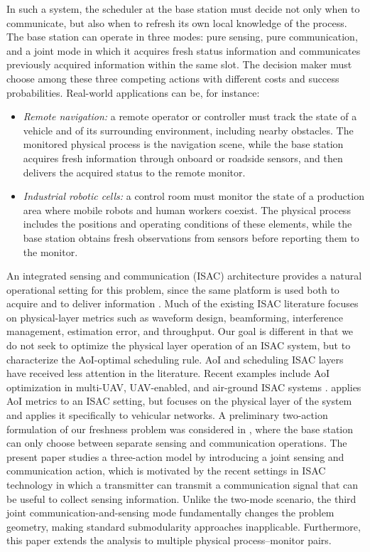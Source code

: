 \documentclass[letterpaper,journal]{IEEEtran}
\begin{document}
In such a system, the scheduler at the base station must decide not only when to communicate, but also when to refresh its own local knowledge of the process. The base station can operate in three modes: pure sensing, pure communication, and a joint mode in which it acquires fresh status information and communicates previously acquired information within the same slot. The decision maker must choose among these three competing actions with different costs and success probabilities.  Real-world applications can be, for instance:
\begin{itemize}
    \item \textit{Remote navigation:} a remote operator or controller must track the state of a vehicle and of its surrounding environment, including nearby obstacles. The monitored physical process is the navigation scene, while the base station acquires fresh information through onboard or roadside sensors, and then delivers the acquired status to the remote monitor.

    \item \textit{Industrial robotic cells:} a control room must monitor the state of a production area where mobile robots and human workers coexist. The physical process includes the positions and operating conditions of these elements, while the base station obtains fresh observations from sensors before reporting them to the monitor.
\end{itemize}

An integrated sensing and communication (ISAC) architecture provides a natural operational setting for this problem, since the same platform is used both to acquire and to deliver information \cite{liu2020joint,luong2021rrm_jrc,zhang2025intelligent_isac,wen2025iscc_survey}. Much of the existing ISAC literature focuses on physical-layer metrics such as waveform design, beamforming, interference management, estimation error, and throughput. Our goal is different in that we do not seek to optimize the physical layer operation of an ISAC system, but to characterize the AoI-optimal scheduling rule. AoI and scheduling ISAC layers have received less attention in the literature. Recent examples include AoI optimization in multi-UAV, UAV-enabled, and air-ground ISAC systems \cite{zhou2024multiuav_aoi,bai2025uav_isac_aoi,liu2025joint_aoi_iscc,mei2025aoi_jamming}. \cite{fan2026multimodal} applies AoI metrics to an ISAC setting, but focuses on the physical layer of the system and applies it specifically to vehicular networks. A preliminary two-action formulation of our freshness problem was considered in \cite{soleymani2026freshness_isac}, where the base station can only choose between separate sensing and communication operations. The present paper studies a three-action model by introducing a joint sensing and communication action, which is motivated by the recent settings in ISAC technology in which  a transmitter can transmit a communication signal that can be useful to collect sensing information. 
Unlike the two-mode scenario, the third joint communication-and-sensing mode fundamentally changes the problem geometry, making standard submodularity approaches inapplicable. Furthermore, this paper extends the analysis to multiple physical process–monitor pairs. 
\end{document}
